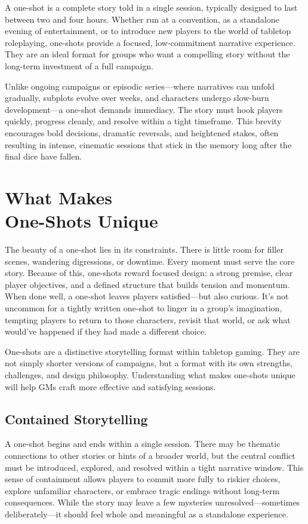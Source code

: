 

A one-shot is a complete story told in a single session, typically designed to last between two and four hours. Whether run at a convention, as a standalone evening of entertainment, or to introduce new players to the world of tabletop roleplaying, one-shots provide a focused, low-commitment narrative experience. They are an ideal format for groups who want a compelling story without the long-term investment of a full campaign.

Unlike ongoing campaigns or episodic series—where narratives can unfold gradually, subplots evolve over weeks, and characters undergo slow-burn development—a one-shot demands immediacy. The story must hook players quickly, progress cleanly, and resolve within a tight timeframe. This brevity encourages bold decisions, dramatic reversals, and heightened stakes, often resulting in intense, cinematic sessions that stick in the memory long after the final dice have fallen.


\section[What Makes One-Shots Unique]{What Makes\\ One-Shots Unique}

The beauty of a one-shot lies in its constraints. There is little room for filler scenes, wandering digressions, or downtime. Every moment must serve the core story. Because of this, one-shots reward focused design: a strong premise, clear player objectives, and a defined structure that builds tension and momentum. When done well, a one-shot leaves players satisfied—but also curious. It’s not uncommon for a tightly written one-shot to linger in a group’s imagination, tempting players to return to those characters, revisit that world, or ask what would’ve happened if they had made a different choice.

One-shots are a distinctive storytelling format within tabletop gaming. They are not simply shorter versions of campaigns, but a format with its own strengths, challenges, and design philosophy. Understanding what makes one-shots unique will help GMs craft more effective and satisfying sessions.

\subsection*{Contained Storytelling}

A one-shot begins and ends within a single session. There may be thematic connections to other stories or hints of a broader world, but the central conflict must be introduced, explored, and resolved within a tight narrative window. This sense of containment allows players to commit more fully to riskier choices, explore unfamiliar characters, or embrace tragic endings without long-term consequences. While the story may leave a few mysteries unresolved—sometimes deliberately—it should feel whole and meaningful as a standalone experience.


